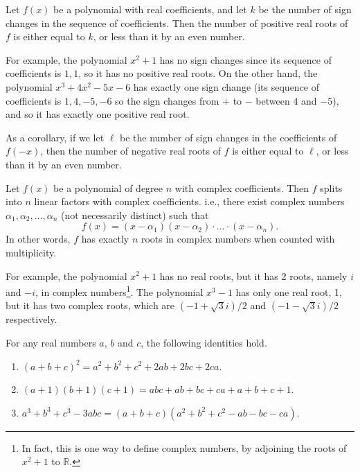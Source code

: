 \begin{theorem}
    \label{thm: ruleofsigns}
    Let $f(x)$ be a polynomial with real coefficients, and let $k$ be the number
    of sign changes in the sequence of coefficients. Then the number of positive
    real roots of $f$ is either equal to $k$, or less than it by an even number.

    For example, the polynomial $x^2 + 1$ has no sign changes since its sequence
    of coefficients is $1, 1$, so it has no positive real roots. On the other
    hand, the polynomial $x^3 + 4x^2 - 5x - 6$ has exactly one sign change (its
    sequence of coefficients is $1, 4, -5, -6$ so the sign changes from $+$ to
    $-$ between $4$ and $-5$), and so it has exactly one positive real root.

    As a corollary, if we let $\ell$ be the number of sign changes in the
    coefficients of $f(-x)$, then the number of negative real roots of $f$ is
    either equal to $\ell$, or less than it by an even number.
\end{theorem}

\begin{theorem}
    \label{thm: fundamentalthmofalg}
    Let $f(x)$ be a polynomial of degree $n$ with complex coefficients. Then
    $f$ splits into $n$ linear factors with complex coefficients. i.e., there
    exist complex numbers $\alpha_1, \alpha_2, \ldots, \alpha_n$ (not
    necessarily distinct) such that
    \[ f(x) = (x - \alpha_1)(x - \alpha_2)\cdot\ldots\cdot(x - \alpha_n). \]
    In other words, $f$ has exactly $n$ roots in complex numbers when counted
    with multiplicity.
    
    For example, the polynomial $x^2 + 1$ has no real roots, but it has 2 roots,
    namely $i$ and $-i$, in complex numbers\footnote{In fact, this is one way to
    define complex numbers, by adjoining the roots of $x^2 + 1$ to
    $\mathbb{R}$.}. The polynomial $x^3 - 1$ has only one real root, 1, but it
    has two complex roots, which are $(-1 + \sqrt{3}i)/2$ and $(-1 -
    \sqrt{3}i)/2$ respectively.
\end{theorem}

\begin{technique}
    \label{teq: algidentities}
    For any real numbers $a$, $b$ and $c$, the following identities hold.
    \begin{enumerate}
        \item $(a + b + c)^2 = a^2 + b^2 + c^2 + 2ab + 2bc + 2ca$.
        \item $(a + 1)(b + 1)(c + 1) = abc + ab + bc + ca + a + b + c + 1$.
        \item $a^3 + b^3 + c^3 - 3abc = (a + b + c)(a^2 + b^2 + c^2 - ab - bc - ca)$. 
    \end{enumerate}
\end{technique}

